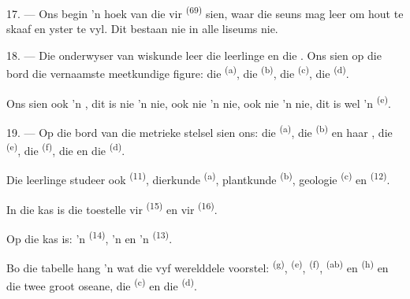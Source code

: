 17. --- Ons begin 'n hoek van die  vir 
\textsuperscript{(69)} sien, waar die seuns mag leer om hout te skaaf en yster te vyl.
Dit bestaan nie in alle liseums nie.

\VUsaut{5.0mm}
\VUsaut{3.6mm}

18. --- Die onderwyser van wiskunde leer die leerlinge  en die . Ons sien op die bord die vernaamste
meetkundige figure: die  \textsuperscript{(a)}, die 
\textsuperscript{(b)}, die  \textsuperscript{(c)}, die 
\textsuperscript{(d)}.

Ons sien ook 'n , dit is nie 'n  nie, ook nie 'n
 nie, ook nie 'n  nie, dit is wel 'n
 \textsuperscript{(e)}.

19. --- Op die bord van die metrieke stelsel sien ons: die 
\textsuperscript{(a)}, die  \textsuperscript{(b)} en haar
, die  \textsuperscript{(e)}, die 
\textsuperscript{(f)}, die  en die 
\textsuperscript{(d)}.

Die leerlinge studeer ook  \textsuperscript{(11)}, dierkunde
\textsuperscript{(a)}, plantkunde \textsuperscript{(b)}, geologie \textsuperscript{(c)}
en  \textsuperscript{(12)}.

In die kas is die toestelle vir  \textsuperscript{(15)} en vir
 \textsuperscript{(16)}.

Op die kas is: 'n  \textsuperscript{(14)}, 'n  en 'n
 \textsuperscript{(13)}.

Bo die tabelle hang 'n  wat die vyf werelddele voorstel:
 \textsuperscript{(g)},  \textsuperscript{(e)},
 \textsuperscript{(f)},  \textsuperscript{(ab)} en
 \textsuperscript{(h)} en die twee groot oseane, die  \textsuperscript{(c)} en die  \textsuperscript{(d)}.
\VUsaut{6.0mm}
\VUfilet{22mm}
